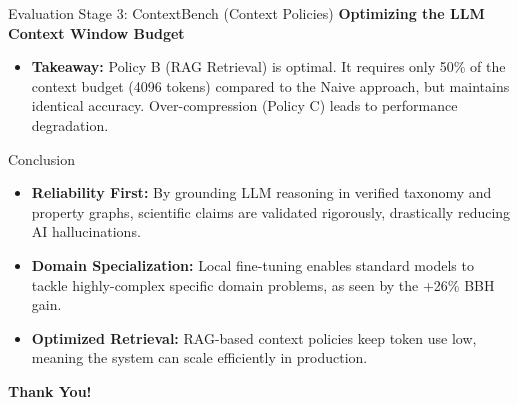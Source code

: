 \documentclass{beamer}
\begin{document}
\begin{frame}{Evaluation Stage 3: ContextBench (Context Policies)}
    \textbf{Optimizing the LLM Context Window Budget}
    
    \vspace{0.3cm}
    \begin{table}[]
        \centering
    \end{table}
    \begin{itemize}
        \item \textbf{Takeaway:} Policy B (RAG Retrieval) is optimal. It requires only 50\% of the context budget (4096 tokens) compared to the Naive approach, but maintains identical accuracy. Over-compression (Policy C) leads to performance degradation.
    \end{itemize}
\end{frame}

\begin{frame}{Conclusion}
    \begin{itemize}
        \item \textbf{Reliability First:} By grounding LLM reasoning in verified taxonomy and property graphs, scientific claims are validated rigorously, drastically reducing AI hallucinations.
        \item \textbf{Domain Specialization:} Local fine-tuning enables standard models to tackle highly-complex specific domain problems, as seen by the +26\% BBH gain.
        \item \textbf{Optimized Retrieval:} RAG-based context policies keep token use low, meaning the system can scale efficiently in production.
    \end{itemize}
    
    \vspace{0.8cm}
    \centering \Large \textbf{Thank You!}
\end{frame}
\end{document}
